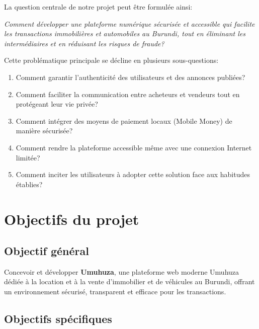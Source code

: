 \documentclass[12pt,a4paper]{report}
\begin{document}
La question centrale de notre projet peut être formulée ainsi:

\begin{center}
    \textit{Comment développer une plateforme numérique sécurisée et accessible qui facilite les transactions immobilières et automobiles au Burundi, tout en éliminant les intermédiaires et en réduisant les risques de fraude?}
\end{center}

Cette problématique principale se décline en plusieurs sous-questions:

\begin{enumerate}
    \item Comment garantir l'authenticité des utilisateurs et des annonces publiées?
    \item Comment faciliter la communication entre acheteurs et vendeurs tout en protégeant leur vie privée?
    \item Comment intégrer des moyens de paiement locaux (Mobile Money) de manière sécurisée?
    \item Comment rendre la plateforme accessible même avec une connexion Internet limitée?
    \item Comment inciter les utilisateurs à adopter cette solution face aux habitudes établies?
\end{enumerate}

\section{Objectifs du projet}

\subsection{Objectif général}

Concevoir et développer \textbf{Umuhuza}, une plateforme web moderne Umuhuza dédiée à la location et à la vente d'immobilier et de véhicules au Burundi, offrant un environnement sécurisé, transparent et efficace pour les transactions.

\subsection{Objectifs spécifiques}
\end{document}
